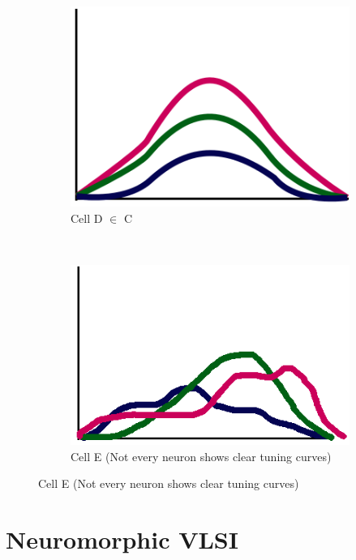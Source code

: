 \documentclass[a4paper, 12pt]{article}
\begin{document}
\begin{figure}[H]
	\centering
	\begin{subfigure}[b]{0.3\textwidth}
		\centering
		\includegraphics[width=\textwidth]{Cell-D.png}
		\caption{Cell D $\in$ C}
	\end{subfigure}%
	~
	\begin{subfigure}[b]{0.3\textwidth}
		\centering
		\includegraphics[width=\textwidth]{Cell-E.png}
		\caption{Cell E (Not every neuron shows clear tuning curves)}
	\end{subfigure}
\end{figure}

\section{Neuromorphic VLSI}
\end{document}
